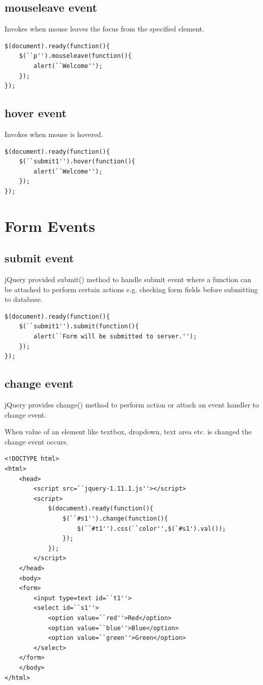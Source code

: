 \documentclass[11pt,a4paper]{article}
\begin{document}
\subsection*{mouseleave event}
Invokes when mouse leaves the focus from the specified element.
\begin{lstlisting}
$(document).ready(function(){
    $(``p'').mouseleave(function(){
        alert(``Welcome'');
    });
}); 
\end{lstlisting}
\subsection*{hover event}
Invokes when mouse is hovered.
\begin{lstlisting}
$(document).ready(function(){
    $(``submit1'').hover(function(){
        alert(``Welcome'');
    });
}); 
\end{lstlisting}
\section*{Form Events}
\subsection*{submit event}
jQuery provided submit() method to handle submit event where a function can be attached to perform certain actions e.g. checking form fields before submitting to database.
\begin{lstlisting}
$(document).ready(function(){
    $(``submit1'').submit(function(){
        alert(``Form will be submitted to server.'');
    });
}); 
\end{lstlisting}
\subsection*{change event}
jQuery provides change() method to perform action or attach an event handler to change event.

When value of an element like textbox, dropdown, text area etc. is changed the change event occurs.

\begin{lstlisting}
<!DOCTYPE html>
<html>
    <head>
        <script src=``jquery-1.11.1.js''></script>
        <script>
            $(document).ready(function(){
                $(``#s1'').change(function(){
                    $(``#t1'').css(``color'',$(`#s1').val());
                });	
            });
        </script>
    </head>
    <body>
    <form>
        <input type=text id=``t1''>
        <select id=``s1''>
            <option value=``red''>Red</option>
            <option value=``blue''>Blue</option>
            <option value=``green''>Green</option>
        </select>
    </form>
    </body>
</html>
\end{lstlisting}
\end{document}
